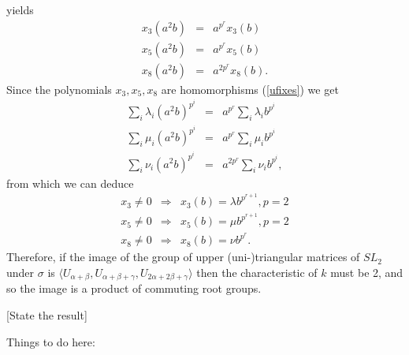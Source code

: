 \begin{example}
	yields
	\begin{eqnarray*}
		x_3(a^2b) &=& a^{p^r}x_3(b)\\
		x_5(a^2b) &=& a^{p^r}x_5(b)\\
		x_8(a^2b) &=& a^{2p^r}x_8(b).
	\end{eqnarray*}
	Since the polynomials $x_3, x_5, x_8$ are homomorphisms (\ref{ufixes}) we get
	\begin{eqnarray*}
		\sum_i \lambda_i (a^2b)^{p^i} &=& a^{p^r} \sum_i \lambda_i b^{p^i}\\
		\sum_i \mu_i (a^2b)^{p^i} &=& a^{p^r} \sum_i \mu_i b^{p^i}\\
		\sum_i \nu_i (a^2b)^{p^i} &=& a^{2p^r} \sum_i \nu_i b^{p^i},
	\end{eqnarray*}
	from which we can deduce
	\begin{eqnarray*}
		x_3 \neq 0 &\Longrightarrow& x_3(b) = \lambda b^{p^{r+1}}, p = 2\\
		x_5 \neq 0 &\Longrightarrow& x_5(b) = \mu b^{p^{r+1}}, p = 2\\
		x_8 \neq 0 &\Longrightarrow& x_8(b) = \nu b^{p^r}.
	\end{eqnarray*}
	Therefore, if the image of the group of upper (uni-)triangular matrices of $SL_2$ under $\sigma$ is $\langle U_{\alpha+\beta}, U_{\alpha+\beta+\gamma}, U_{2\alpha+2\beta+\gamma} \rangle$ then the characteristic of $k$ must be 2, and so the image is a product of commuting root groups.
\end{example}

[State the result]

Things to do here:

